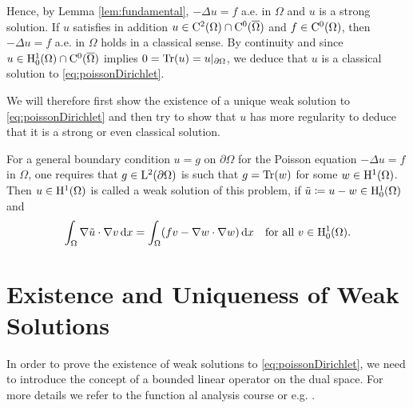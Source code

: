 Hence, by Lemma \ref{lem:fundamental}, $-\Delta u = f$ a.e. in $\Omega$ and $u$ is a strong solution. If $u$ satisfies in addition $u \in \mathrm{C}^2(\Omega) \cap \mathrm{C}^0(\overline\Omega)$ and $f \in \mathrm{C}^0(\Omega)$, then $-\Delta u = f$ a.e. in $\Omega$ holds in a classical sense. 
By continuity and since $u \in \mathrm{H}_0^1(\Omega) \cap \mathrm{C}^0(\overline\Omega)$ implies $0 = \operatorname{Tr}(u) = u|_{\partial\Omega}$, we deduce that $u$ is a classical solution to \eqref{eq:poissonDirichlet}.

We will therefore first show the existence of a unique weak solution to \eqref{eq:poissonDirichlet} and then try to show that $u$ has more regularity to deduce that it is a strong or even classical solution.

For a general boundary condition $u = g$ on $\partial\Omega$ for the Poisson equation $-\Delta u = f$ in $\Omega$, one requires that $g \in \mathrm{L}^2(\partial\Omega)$ is such that $g = \operatorname{Tr}(w)$ for some $w \in \mathrm{H}^1(\Omega)$.
Then $u \in \mathrm{H}^1(\Omega)$ is called a weak solution of this problem, if $\tilde u \coloneqq u - w \in \mathrm{H}_0^1(\Omega)$ and 
$$
\int_\Omega \nabla \tilde u \cdot \nabla v \, {\operatorname{d}\!{x}}
= \int_\Omega (f v - \nabla w \cdot \nabla w) \, {\operatorname{d}\!{x}} \quad\text{for all } v \in \mathrm{H}_0^1(\Omega).
$$

\section{Existence and Uniqueness of Weak Solutions}

In order to prove the existence of weak solutions to \eqref{eq:poissonDirichlet}, we need to introduce the concept of a bounded linear operator on the dual space.
For more details we refer to the function al analysis course or e.g. \cite[Sections 2.3, 2.4]{dobrowolski2010angewandte}.

